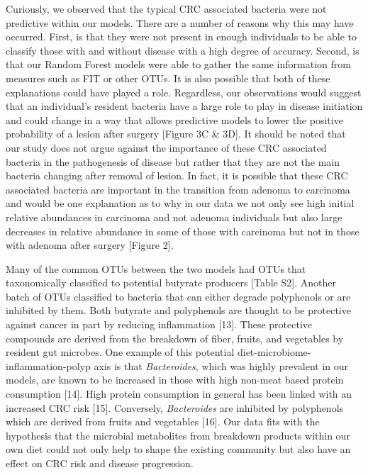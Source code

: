 \documentclass[12pt,]{article}
\begin{document}
Curiously, we observed that the typical CRC associated bacteria were not
predictive within our models. There are a number of reasons why this may
have occurred. First, is that they were not present in enough
individuals to be able to classify those with and without disease with a
high degree of accuracy. Second, is that our Random Forest models were
able to gather the same information from measures such as FIT or other
OTUs. It is also possible that both of these explanations could have
played a role. Regardless, our observations would suggest that an
individual's resident bacteria have a large role to play in disease
initiation and could change in a way that allows predictive models to
lower the positive probability of a lesion after surgery {[}Figure 3C \&
3D{]}. It should be noted that our study does not argue against the
importance of these CRC associated bacteria in the pathogenesis of
disease but rather that they are not the main bacteria changing after
removal of lesion. In fact, it is possible that these CRC associated
bacteria are important in the transition from adenoma to carcinoma and
would be one explanation as to why in our data we not only see high
initial relative abundances in carcinoma and not adenoma individuals but
also large decreases in relative abundance in some of those with
carcinoma but not in those with adenoma after surgery {[}Figure 2{]}.

Many of the common OTUs between the two models had OTUs that
taxonomically classified to potential butyrate producers {[}Table S2{]}.
Another batch of OTUs classified to bacteria that can either degrade
polyphenols or are inhibited by them. Both butyrate and polyphenols are
thought to be protective against cancer in part by reducing inflammation
{[}13{]}. These protective compounds are derived from the breakdown of
fiber, fruits, and vegetables by resident gut microbes. One example of
this potential diet-microbiome-inflammation-polyp axis is that
\emph{Bacteroides}, which was highly prevalent in our models, are known
to be increased in those with high non-meat based protein consumption
{[}14{]}. High protein consumption in general has been linked with an
increased CRC risk {[}15{]}. Conversely, \emph{Bacteroides} are
inhibited by polyphenols which are derived from fruits and vegetables
{[}16{]}. Our data fits with the hypothesis that the microbial
metabolites from breakdown products within our own diet could not only
help to shape the existing community but also have an effect on CRC risk
and disease progression.
\end{document}
